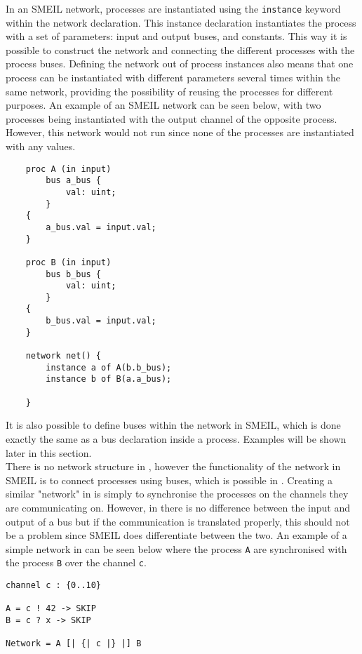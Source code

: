 In an SMEIL network, processes are instantiated using the \texttt{instance} keyword within the network declaration. This instance declaration instantiates the process with a set of parameters: input and output buses, and constants. This way it is possible to construct the network and connecting the different processes with the process buses.
Defining the network out of process instances also means that one process can be instantiated with different parameters several times within the same network, providing the possibility of reusing the processes for different purposes.
An example of an SMEIL network can be seen below, with two processes being instantiated with the output channel of the opposite process. However, this network would not run since none of the processes are instantiated with any values.
\begin{verbatim}
    proc A (in input)
        bus a_bus {
            val: uint;
        }
    {
        a_bus.val = input.val;
    }

    proc B (in input)
        bus b_bus {
            val: uint;
        }
    {
        b_bus.val = input.val;
    }

    network net() {
        instance a of A(b.b_bus);
        instance b of B(a.a_bus);

    }
\end{verbatim}
It is also possible to define buses within the network in SMEIL, which is done exactly the same as a bus declaration inside a process. Examples will be shown later in this section.\\

There is no network structure in \cspm{}, however the functionality of the network in SMEIL is to connect processes using buses, which is possible in \cspm{}. Creating a similar "network" in \cspm{} is simply to synchronise the processes on the channels they are communicating on. However, in \cspm{} there is no difference between the input and output of a bus but if the communication is translated properly, this should not be a problem since SMEIL does differentiate between the two.
An example of a simple network in \cspm{} can be seen below where the process \texttt{A} are synchronised with the process \texttt{B} over the channel \texttt{c}.
\begin{verbatim}
channel c : {0..10}

A = c ! 42 -> SKIP
B = c ? x -> SKIP

Network = A [| {| c |} |] B
\end{verbatim}


